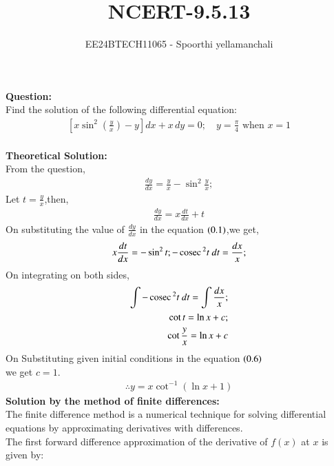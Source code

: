 \documentclass[journal]{IEEEtran}
\begin{document}

\vspace{3cm}

\title{NCERT-9.5.13}
\author{EE24BTECH11065 - Spoorthi yellamanchali
}
{\let\newpage\relax\maketitle}

\renewcommand{\thefigure}{\theenumi}
\renewcommand{\thetable}{\theenumi}
\setlength{\intextsep}{10pt} %


\renewcommand{\thetable}{\theenumi}


\textbf{Question:}
\\
Find the solution of the following differential equation:
\begin{align*} 
\left[ x \sin^2 \left( \frac{y}{x} \right) - y \right] dx + x \, dy = 0; \quad y = \frac{\pi}{4} \text{ when } x = 1 
\end{align*}
\\
\textbf{ Theoretical Solution: }
\\
From the question,
\begin{align} 
\frac{dy}{dx} = \frac{y}{x} - \sin^2{\frac{y}{x}};
\end{align} 
Let $t = \frac{y}{x}$,then, 
\begin{align}
    \frac{dy}{dx} = x\frac{dt}{dx} + t
\end{align}
On substituting the value of $\frac{dy}{dx}$ in the equation $\left(0.1\right)$,we get,
\begin{align}
x\frac{dt}{dx} = -\sin^2{t};
-\,\text{cosec}\,^2{t}\ dt = \frac{dx}{x};
\end{align}
On integrating on both sides,
\begin{align}
     \int -\,\text{cosec}\,^2{t}\ dt = \int \frac{dx}{x};\\
     \cot{t} = \ln{x} + c;\\
     \cot{\frac{y}{x}} = \ln{x} + c
\end{align}
On Substituting given initial conditions in the equation $\left(0.6\right)$\\
we get $c = 1$.
\begin{align}
\therefore y = x\cot^{-1}{(\ln{x} + 1)}
\end{align}
\textbf{Solution by the method of finite differences:}
\\
The finite difference method is a numerical technique for solving differential equations by approximating derivatives with differences.\\
The first forward difference approximation of the derivative of $f(x)$ at $x$ is given by: \\
\end{document}
